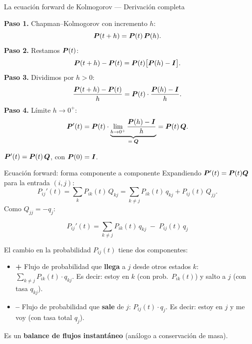 \documentclass[aspectratio=1610, 9pt]{beamer}
\begin{document}
\begin{frame}[fragile]{La ecuación forward de Kolmogorov --- Derivación completa}
  \begin{derivbox}
    \textbf{Paso 1.} Chapman--Kolmogorov con incremento $h$:
    \[
      \bm{P}(t+h) = \bm{P}(t)\,\bm{P}(h).
    \]
    \textbf{Paso 2.} Restamos $\bm{P}(t)$:
    \[
      \bm{P}(t+h) - \bm{P}(t) = \bm{P}(t)\bigl[\bm{P}(h) - \bm{I}\bigr].
    \]
    \textbf{Paso 3.} Dividimos por $h > 0$:
    \[
      \frac{\bm{P}(t+h) - \bm{P}(t)}{h} = \bm{P}(t)\cdot\frac{\bm{P}(h) - \bm{I}}{h}.
    \]
    \textbf{Paso 4.} Límite $h \to 0^+$:
    \[
      \bm{P}'(t) = \bm{P}(t) \cdot \underbrace{\lim_{h \to 0^+}\frac{\bm{P}(h)-\bm{I}}{h}}_{=\;\bm{Q}} = \bm{P}(t)\,\bm{Q}.
    \]
  \end{derivbox}

  \vspace{1mm}
  \begin{teoremabox}
    $\bm{P}'(t) = \bm{P}(t)\,\bm{Q}$, \quad con $\bm{P}(0)=\bm{I}$.
  \end{teoremabox}
\end{frame}

\begin{frame}[fragile]{Ecuación forward: forma componente a componente}
  Expandiendo $\bm{P}'(t) = \bm{P}(t)\bm{Q}$ para la entrada $(i,j)$:
  \[
    P_{ij}'(t) = \sum_{k} P_{ik}(t)\,Q_{kj} = \sum_{k \neq j} P_{ik}(t)\,q_{kj} + P_{ij}(t)\,Q_{jj}.
  \]
  Como $Q_{jj} = -q_j$:

  \begin{thmbox}
    \vspace{-3mm}
    \begin{equation*}
      \boxed{P_{ij}'(t) = \sum_{k \neq j} P_{ik}(t)\,q_{kj} \;-\; P_{ij}(t)\,q_j}
    \end{equation*}
  \end{thmbox}

  \begin{situacionbox}
    El cambio en la probabilidad $P_{ij}(t)$ tiene dos componentes:
    \begin{itemize}
      \item {\color{softgreen}\textbf{+}} Flujo de probabilidad que \textbf{llega} a $j$ desde otros estados $k$: $\sum_{k \neq j} P_{ik}(t)\cdot q_{kj}$. Es decir: estoy en $k$ (con prob.\ $P_{ik}(t)$) y salto a $j$ (con tasa $q_{kj}$).
      \item {\color{softred}\textbf{--}} Flujo de probabilidad que \textbf{sale} de $j$: $P_{ij}(t)\cdot q_j$. Es decir: estoy en $j$ y me voy (con tasa total $q_j$).
    \end{itemize}
    Es un \textbf{balance de flujos instantáneo} (análogo a conservación de masa).
  \end{situacionbox}
\end{frame}
\end{document}
